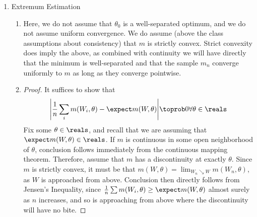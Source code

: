 \documentclass[10pt]{article}
\begin{document}
\maketitle

\begin{enumerate}
	\item Extremum Estimation \begin{enumerate} \item Here, we do not assume that $\theta_0$ is a well-separated optimum, and we do not assume uniform convergence. We do assume (above the class assumptions about consistency) that $m$ is strictly convex. Strict convexity does imply the above, as combined with continuity we will have directly that the minimum is well-separated and that the sample $m_n$ converge uniformly to $m$ as long as they converge pointwise. \item \begin{proof} It suffices to show that \[\Bigg| \frac{1}{n}\sum_i m(W_i,\theta) - \expect m(W,\theta)\Bigg| \toprob 0 \forall \theta \in \reals \]Fix some $\theta \in \reals$, and recall that we are assuming that $\expect m(W,\theta) \in \reals$. If $m$ is continuous in some open neighborhood of $\theta$, conclusion follows immediately from the continuous mapping theorem. Therefore, assume that $m$ has a discontinuity at exactly $\theta$. Since $m$ is strictly convex, it must be that $m(W,\theta) = \lim_{W_n\searrow W} m(W_n,\theta)$, \ie\;as $W$ is approached from above. Conclusion then directly follows from Jensen's Inequality, since $\frac{1}{n}\sum m(W_i,\theta) \ge \expect m(W,\theta)$ almost surely as $n$ increases, and so is approaching from above where the discontinuity will have no bite. \end{proof} \end{enumerate}

\end{enumerate}
\end{document}
